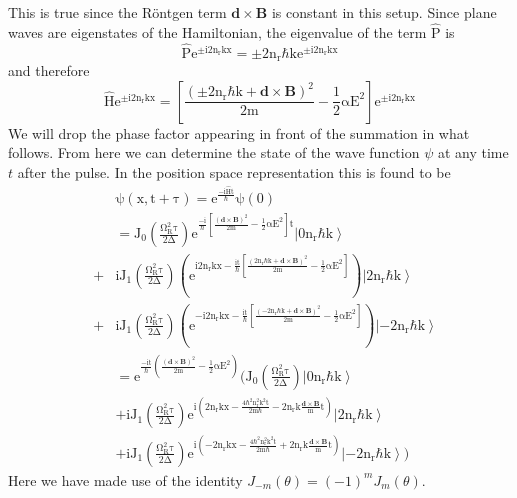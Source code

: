 This is true since the R\"{o}ntgen term $\mathbf{d}\times\mathbf{B}$ is constant in this setup.  Since plane waves are eigenstates of the Hamiltonian, the eigenvalue of the term $\mathrm{\hat{P}}$ is
\begin{equation}
\mathrm{\hat{P} e^{\pm i2n_rkx}=\pm2n_r\hbar k e^{\pm i2n_rkx}}
\end{equation}
and therefore
\begin{equation}
\mathrm{\hat{H} e^{\pm i2n_rkx}=\left[\frac{\left(\pm 2n_r\hbar k+\mathbf{d}\times\mathbf{B}\right)^2}{2m}-\frac{1}{2}\alpha E^2\right]e^{\pm i2n_rkx}}
\end{equation}
We will drop the phase factor appearing in front of the summation in what follows. From here we can determine the state of the wave function $\psi$ at any time $t$ after the pulse.  In the position space representation this is found to be 
\begin{eqnarray}
&&\mathrm{\psi(x,t+\tau)=e^{\frac{-i\hat{H}t}{\hbar}}\psi(0)} \nonumber \\
&&=\mathrm{J_0\left(\frac{\Omega_R^2\tau}{2\Delta}\right)e^{\frac{-i}{\hbar}\left[\frac{\left(\mathbf{d}\times\mathbf{B}\right)^2}{2m}-\frac{1}{2}\alpha E^2\right]t}\left|0n_r\hbar k\right>} \nonumber \\
&+&\mathrm{iJ_1\left(\frac{\Omega_R^2\tau}{2\Delta}\right)\left(e^{i2n_rkx-\frac{it}{\hbar}\left[\frac{\left( 2n_r\hbar k+\mathbf{d}\times\mathbf{B}\right)^2}{2m}-\frac{1}{2}\alpha E^2\right]}\right)\left|2n_r\hbar k\right>} \nonumber \\
&+&\mathrm{iJ_1\left(\frac{\Omega_R^2\tau}{2\Delta}\right)\left(e^{-i2n_rkx-\frac{it}{\hbar}\left[\frac{\left(-2n_r\hbar k+\mathbf{d}\times\mathbf{B}\right)^2}{2m}-\frac{1}{2}\alpha E^2\right]}\right)\left|-2n_r\hbar k\right>} \nonumber \\
&&=\mathrm{e^{\frac{-it}{\hbar}\left(\frac{\left(\mathbf{d}\times\mathbf{B}\right)^2}{2m}-\frac{1}{2}\alpha E^2\right)}\bigg(J_0\left(\frac{\Omega_R^2\tau}{2\Delta}\right)\left|0n_r\hbar k\right>}\nonumber \\
&&+\mathrm{iJ_1\left(\frac{\Omega_R^2\tau}{2\Delta}\right)e^{i\left(2n_rkx-\frac{4\hbar^2n_r^2k^2t}{2m\hbar}-2n_rk\frac{\mathbf{d}\times\mathbf{B}}{m}t\right)}\left|2n_r\hbar k\right>}\nonumber \\
&&+\mathrm{iJ_1\left(\frac{\Omega_R^2\tau}{2\Delta}\right)e^{i\left(-2n_rkx-\frac{4\hbar^2n_r^2k^2t}{2m\hbar}+2n_rk\frac{\mathbf{d}\times\mathbf{B}}{m}t\right)}\left|-2n_r\hbar k\right>\bigg)}
\end{eqnarray}
Here we have made use of the identity $J_{-m}(\theta)=(-1)^mJ_{m}(\theta)$.  


